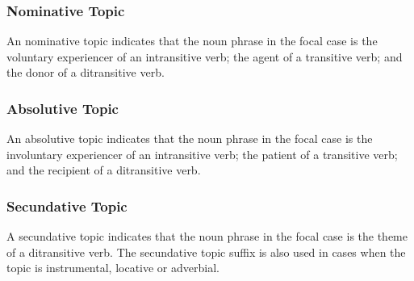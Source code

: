 \documentclass[grammar]{subfiles}
\begin{document}



  \subsubsection{Nominative Topic}
  \label{sssec:vm_nom_topic}

  An nominative topic indicates that the noun phrase in the focal case is the voluntary experiencer of an intransitive verb; the agent of a transitive verb; and the donor of a ditransitive verb.

  \subsubsection{Absolutive Topic}
  \label{sssec:vm_abs_topic}

  An absolutive topic indicates that the noun phrase in the focal case is the involuntary experiencer of an intransitive verb; the patient of a transitive verb; and the recipient of a ditransitive verb. 

  \subsubsection{Secundative Topic}
  \label{sssec:vm_sdt_topic}

  A secundative topic indicates that the noun phrase in the focal case is the theme of a ditransitive verb. The secundative topic suffix is also used in cases when the topic is instrumental, locative or adverbial.
  
\end{document}
